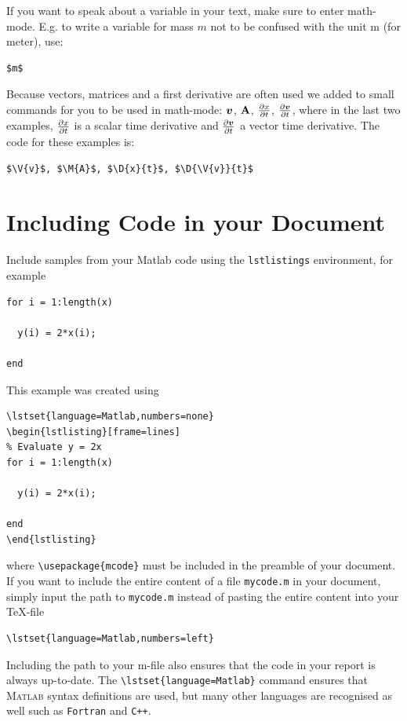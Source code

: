 If you want to speak about a variable in your text, make sure to enter math-mode. E.g. to write a variable for mass $m$ not to be confused with the unit m (for meter), use:
\begin{verbatim}
$m$
\end{verbatim}

Because vectors, matrices and a first derivative are often used we added to small commands for you to be used in math-mode:
$\boldsymbol{v}$, $\mathbf{A}$, $\frac{\partial x}{\partial t}$, $\frac{\partial \boldsymbol{v}}{\partial t}$, where in the last two examples, $\frac{\partial x}{\partial t}$ is a scalar time derivative and $\frac{\partial \boldsymbol{v}}{\partial t}$ a vector time derivative.
The code for these examples is: 
\begin{verbatim}
$\V{v}$, $\M{A}$, $\D{x}{t}$, $\D{\V{v}}{t}$
\end{verbatim}


\section{Including Code in your Document}
Include samples from your Matlab code using the \texttt{lstlistings} environment, for example
\lstset{language=Matlab,numbers=none}
\begin{lstlisting}[frame=lines]
% Evaluate y = 2x
for i = 1:length(x)

  y(i) = 2*x(i);

end
\end{lstlisting}
This example was created using
\begin{verbatim}
\lstset{language=Matlab,numbers=none}
\begin{lstlisting}[frame=lines]
% Evaluate y = 2x
for i = 1:length(x)

  y(i) = 2*x(i);

end
\end{lstlisting}
\end{verbatim}
where \texttt{\textbackslash usepackage\{mcode\}} must be included in the preamble of your document. If you want to include the entire content of a file \texttt{mycode.m} in your document, simply input the path to \texttt{mycode.m} instead of pasting the entire content into your \TeX -file
\begin{verbatim}
\lstset{language=Matlab,numbers=left}

\end{verbatim}
Including the path to your m-file also ensures that the code in your report is always up-to-date. The \texttt{\textbackslash lstset\{language=Matlab\}} command ensures that \textsc{Matlab} syntax definitions are used, but many other languages are recognised as well such as \texttt{Fortran} and \texttt{C++}.
